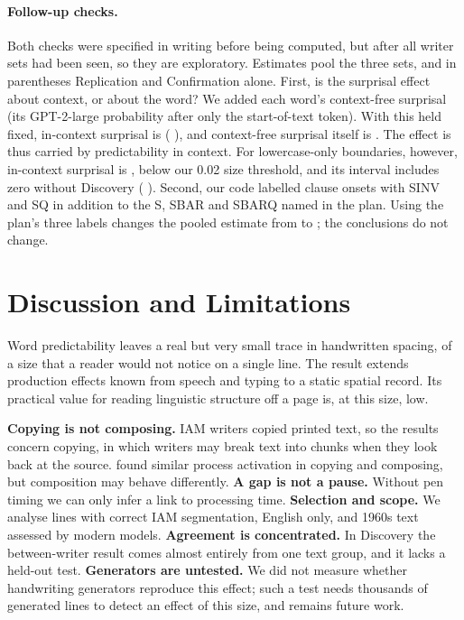 \documentclass[11pt]{article}
\begin{document}
\paragraph{Follow-up checks.}\label{sec:followups} Both checks were specified in writing before being computed, but after all writer sets had been seen, so they are exploratory. Estimates pool the three sets, and in parentheses Replication and Confirmation alone. First, is the surprisal effect about context, or about the word? We added each word's context-free surprisal (its GPT-2-large probability after only the start-of-text token). With this held fixed, in-context surprisal is \fuCtx{} \fuCtxCI{} (\fuCtxHeld{} \fuCtxHeldCI), and context-free surprisal itself is \fuNc{} \fuNcCI. The effect is thus carried by predictability in context. For lowercase-only boundaries, however, in-context surprisal is \fuCtxLow{} \fuCtxLowCI, below our 0.02 size threshold, and its interval includes zero without Discovery (\fuCtxLowHeld{} \fuCtxLowHeldCI). Second, our code labelled clause onsets with SINV and SQ in addition to the S, SBAR and SBARQ named in the plan. Using the plan's three labels changes the pooled estimate from \fuClauseFive{} to \fuClauseStrict{} \fuClauseStrictCI; the conclusions do not change.

\section{Discussion and Limitations}
Word predictability leaves a real but very small trace in handwritten spacing, of a size that a reader would not notice on a single line. The result extends production effects known from speech and typing to a static spatial record. Its practical value for reading linguistic structure off a page is, at this size, low.

\textbf{Copying is not composing.} IAM writers copied printed text, so the results concern copying, in which writers may break text into chunks when they look back at the source. \citet{olive2002} found similar process activation in copying and composing, but composition may behave differently. \textbf{A gap is not a pause.} Without pen timing we can only infer a link to processing time. \textbf{Selection and scope.} We analyse lines with correct IAM segmentation, English only, and 1960s text assessed by modern models. \textbf{Agreement is concentrated.} In Discovery the between-writer result comes almost entirely from one text group, and it lacks a held-out test. \textbf{Generators are untested.} We did not measure whether handwriting generators reproduce this effect; such a test needs thousands of generated lines to detect an effect of this size, and remains future work.
\end{document}
